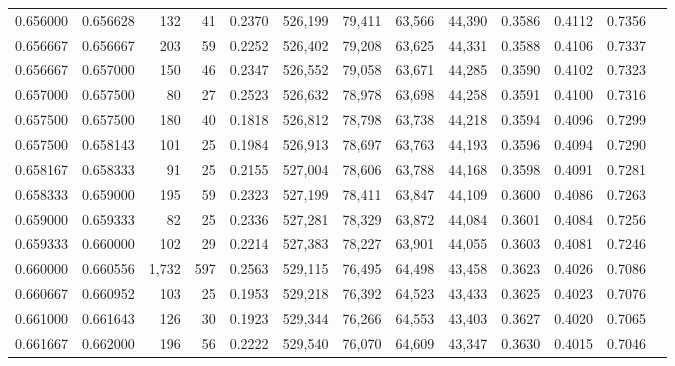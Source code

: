 \begin{tabular}{rrrrrrrrrrrrr}
0.656000 & 0.656628 &   132 &  41 &                                     0.2370 & 526,199 &  79,411 &  63,566 &  44,390 & 0.3586 & 0.4112 & 0.7356 \\
0.656667 & 0.656667 &   203 &  59 &                                     0.2252 & 526,402 &  79,208 &  63,625 &  44,331 & 0.3588 & 0.4106 & 0.7337 \\
0.656667 & 0.657000 &   150 &  46 &                                     0.2347 & 526,552 &  79,058 &  63,671 &  44,285 & 0.3590 & 0.4102 & 0.7323 \\
0.657000 & 0.657500 &    80 &  27 &                                     0.2523 & 526,632 &  78,978 &  63,698 &  44,258 & 0.3591 & 0.4100 & 0.7316 \\
0.657500 & 0.657500 &   180 &  40 &                                     0.1818 & 526,812 &  78,798 &  63,738 &  44,218 & 0.3594 & 0.4096 & 0.7299 \\
0.657500 & 0.658143 &   101 &  25 &                                     0.1984 & 526,913 &  78,697 &  63,763 &  44,193 & 0.3596 & 0.4094 & 0.7290 \\
0.658167 & 0.658333 &    91 &  25 &                                     0.2155 & 527,004 &  78,606 &  63,788 &  44,168 & 0.3598 & 0.4091 & 0.7281 \\
0.658333 & 0.659000 &   195 &  59 &                                     0.2323 & 527,199 &  78,411 &  63,847 &  44,109 & 0.3600 & 0.4086 & 0.7263 \\
0.659000 & 0.659333 &    82 &  25 &                                     0.2336 & 527,281 &  78,329 &  63,872 &  44,084 & 0.3601 & 0.4084 & 0.7256 \\
0.659333 & 0.660000 &   102 &  29 &                                     0.2214 & 527,383 &  78,227 &  63,901 &  44,055 & 0.3603 & 0.4081 & 0.7246 \\
0.660000 & 0.660556 & 1,732 & 597 &                                     0.2563 & 529,115 &  76,495 &  64,498 &  43,458 & 0.3623 & 0.4026 & 0.7086 \\
0.660667 & 0.660952 &   103 &  25 &                                     0.1953 & 529,218 &  76,392 &  64,523 &  43,433 & 0.3625 & 0.4023 & 0.7076 \\
0.661000 & 0.661643 &   126 &  30 &                                     0.1923 & 529,344 &  76,266 &  64,553 &  43,403 & 0.3627 & 0.4020 & 0.7065 \\
0.661667 & 0.662000 &   196 &  56 &                                     0.2222 & 529,540 &  76,070 &  64,609 &  43,347 & 0.3630 & 0.4015 & 0.7046 \\

\end{tabular}
